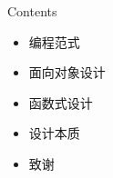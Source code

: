 \begin{frame}
  \titlepage
\end{frame}

\begin{frame}{Contents}
    \begin{itemize}
    \item \alert{编程范式}
    \item \alert{面向对象设计} 
    \item \alert{函数式设计} 
    \item \alert{设计本质} 
    \item \alert{致谢}
    \end{itemize}
\end{frame}
